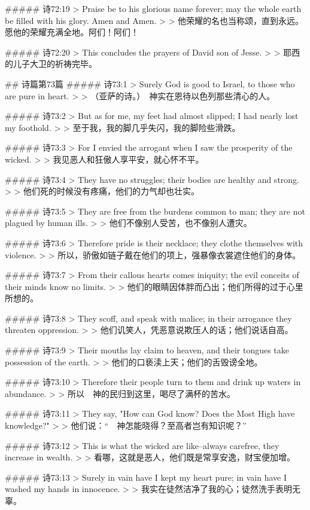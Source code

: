 ##### 诗72:19
> Praise be to his glorious name forever; may the whole earth be filled with his glory. Amen and Amen.
>
> 他荣耀的名也当称颂，直到永远。愿他的荣耀充满全地。阿们！阿们！


##### 诗72:20
> This concludes the prayers of David son of Jesse.
>
> 耶西的儿子大卫的祈祷完毕。


## 诗篇第73篇
##### 诗73:1
> Surely God is good to Israel, to those who are pure in heart.
>
> （亚萨的诗。）　神实在恩待以色列那些清心的人。


##### 诗73:2
> But as for me, my feet had almost slipped; I had nearly lost my foothold.
>
> 至于我，我的脚几乎失闪，我的脚险些滑跌。


##### 诗73:3
> For I envied the arrogant when I saw the prosperity of the wicked.
>
> 我见恶人和狂傲人享平安，就心怀不平。


##### 诗73:4
> They have no struggles; their bodies are healthy and strong.
>
> 他们死的时候没有疼痛，他们的力气却也壮实。


##### 诗73:5
> They are free from the burdens common to man; they are not plagued by human ills.
>
> 他们不像别人受苦，也不像别人遭灾。


##### 诗73:6
> Therefore pride is their necklace; they clothe themselves with violence.
>
> 所以，骄傲如链子戴在他们的项上，强暴像衣裳遮住他们的身体。


##### 诗73:7
> From their callous hearts comes iniquity; the evil conceits of their minds know no limits.
>
> 他们的眼睛因体胖而凸出；他们所得的过于心里所想的。


##### 诗73:8
> They scoff, and speak with malice; in their arrogance they threaten oppression.
>
> 他们讥笑人，凭恶意说欺压人的话；他们说话自高。


##### 诗73:9
> Their mouths lay claim to heaven, and their tongues take possession of the earth.
>
> 他们的口亵渎上天；他们的舌毁谤全地。


##### 诗73:10
> Therefore their people turn to them and drink up waters in abundance.
>
> 所以　神的民归到这里，喝尽了满杯的苦水。


##### 诗73:11
> They say, "How can God know? Does the Most High have knowledge?"
>
> 他们说：“　神怎能晓得？至高者岂有知识呢？”


##### 诗73:12
> This is what the wicked are like--always carefree, they increase in wealth.
>
> 看哪，这就是恶人，他们既是常享安逸，财宝便加增。


##### 诗73:13
> Surely in vain have I kept my heart pure; in vain have I washed my hands in innocence.
>
> 我实在徒然洁净了我的心；徒然洗手表明无辜。


